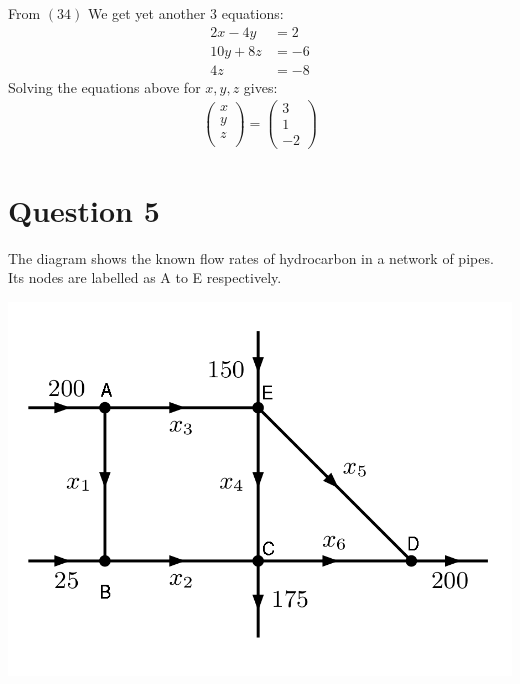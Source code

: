 \documentclass[11pt]{article}
\begin{document}
From $(34)$ We get yet another 3 equations:
\begin{align*}
2x-4y&=2\\
10y+8z&=-6\\
4z&=-8
\end{align*}
Solving the equations above  for $x,y,z$ gives:
\begin{align*}
\left(\begin{array}{c}
x\\
y\\
z\\
\end{array}\right)
=
\left(\begin{array}{c}
3\\
1\\
-2
\end{array}\right)
\end{align*}

\section{Question 5}
The diagram shows the known flow rates of hydrocarbon in a network of pipes.
Its nodes are labelled as A to E respectively.

\includegraphics[scale=0.4]{q5.png}
\newpage
\end{document}
